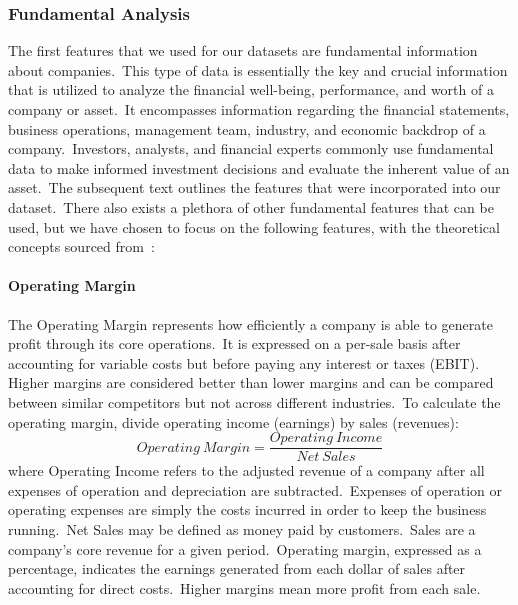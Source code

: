 \documentclass[../xlapes02]{subfiles}
\begin{document}
    \subsubsection{Fundamental Analysis}\label{subsubsec:fundamental-analysis}
    The first features that we used for our datasets are fundamental information about companies.\ This type of data is essentially the key and crucial information that is utilized to analyze the financial well-being, performance, and worth of a company or asset.\ It encompasses information regarding the financial statements, business operations, management team, industry, and economic backdrop of a company.\ Investors, analysts, and financial experts commonly use fundamental data to make informed investment decisions and evaluate the inherent value of an asset.\ The subsequent text outlines the features that were incorporated into our dataset.\ There also exists a plethora of other fundamental features that can be used, but we have chosen to focus on the following features, with the theoretical concepts sourced from~\cite{investopedia}:

    \paragraph{Operating Margin}\label{par:operating-margin}
    The Operating Margin represents how efficiently a company is able to generate profit through its core operations.\ It is expressed on a per-sale basis after accounting for variable costs but before paying any interest or taxes (EBIT). Higher margins are considered better than lower margins and can be compared between similar competitors but not across different industries.\ To calculate the operating margin, divide operating income (earnings) by sales (revenues):
    \begin{equation}
        \label{eq:operating-margin}
        Operating\ Margin=\frac{Operating\ Income}{Net\ Sales}
    \end{equation}
    where Operating Income refers to the adjusted revenue of a company after all expenses of operation and depreciation are subtracted.\ Expenses of operation or operating expenses are simply the costs incurred in order to keep the business running.\ Net Sales may be defined as money paid by customers.\ Sales are a company's core revenue for a given period.\ Operating margin, expressed as a percentage, indicates the earnings generated from each dollar of sales after accounting for direct costs.\ Higher margins mean more profit from each sale.
\end{document}
